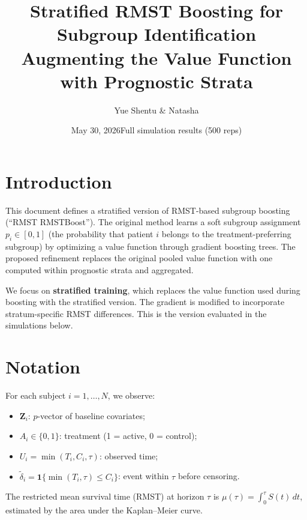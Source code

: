 \documentclass[11pt,letterpaper]{article}
\title{%
  \textbf{Stratified RMST Boosting for Subgroup Identification}\\[4pt]
  \large Augmenting the Value Function with Prognostic Strata}
\author{Yue Shentu \& Natasha}
\date{May 30, 2026\newline\small Full simulation results (500 reps)}
\newcommand{\ind}[1]{\mathbf{1}\{#1\}}
\begin{document}
\maketitle
\tableofcontents
\newpage

\section{Introduction}

This document defines a stratified version of RMST-based subgroup boosting
(``RMST RMSTBoost'').  The original method learns a soft subgroup
assignment $p_i \in [0,1]$ (the probability that patient $i$ belongs to the
treatment-preferring subgroup) by optimizing a value function through
gradient boosting trees.  The proposed refinement replaces the original
pooled value function with one computed within prognostic strata and
aggregated.

We focus on \textbf{stratified training}, which replaces the value
function used during boosting with the stratified version.  The
gradient is modified to incorporate stratum-specific RMST differences.
This is the version evaluated in the simulations below.

\section{Notation}

For each subject $i = 1,\dots,N$, we observe:
\begin{itemize}
  \item $\bm{Z}_i$: $p$-vector of baseline covariates;
  \item $A_i \in \{0,1\}$: treatment (1 = active, 0 = control);
  \item $U_i = \min(T_i, C_i, \tau)$: observed time;
  \item $\widetilde\delta_i = \ind{\min(T_i,\tau) \le C_i}$: event within
        $\tau$ before censoring.
\end{itemize}

The restricted mean survival time (RMST) at horizon $\tau$ is
$\mu(\tau) = \int_0^\tau S(t)\,dt$, estimated by the area under the
Kaplan--Meier curve.

\end{document}
